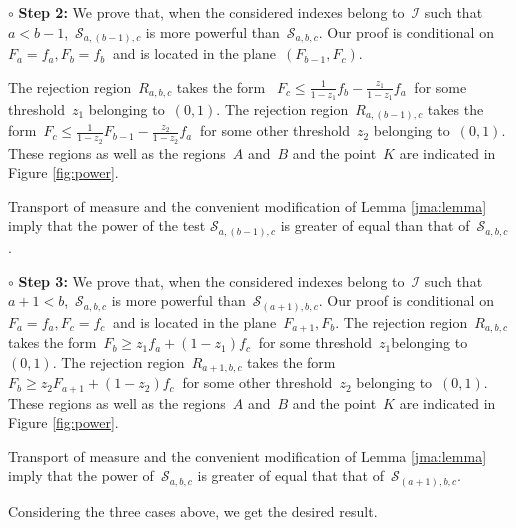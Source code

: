 \documentclass[final,numbib]{imaiai}%
\numberwithin{equation}{section}
\def\cS{\mathcal{S}}
\newcommand{\<}{\langle}
\renewcommand{\>}{\rangle}
\newcommand{\1}{\mathds{1}}
\begin{document}
{  
  
 \noindent
 {$\circ$ \bf Step 2: } We prove that, when the considered  indexes belong to~$\mathcal I$ such that~$a<b-1$,~$\cS_{a,(b-1),c}$ is more powerful than~$\cS_{a,b,c}$. 
 Our proof is conditional on~$F_a=f_a,F_b =f_b~$ and is located  
 in the plane~$(F_{b-1}, F_c)$. 
 
 
 \noindent
  The rejection region~$R_{a,b,c}$ takes the form 
~$F_c \leq  \frac{1}{1-z_1}f_b  -\frac{z_1}{1-z_1}f_a~$
   for some threshold~$z_1$ belonging to~$(0,1)$.\newline
The rejection region~$R_{a,(b-1),c}$ takes the form~$F_c \leq \frac{1}{1-z_2} F_{b-1} - \frac{z_2}{1-z_2} f_a~$ for some  other threshold~$z_2$ belonging to~$(0,1)$. \newline
These regions as well as the regions~$A$ and~$B$ and the point~$K$  are indicated in Figure \ref{fig:power}.

Transport of measure  and the convenient modification of Lemma \ref{jma:lemma} imply that the power of the test $\cS_{a,(b-1),c}$ is greater of equal than that of~$\cS_{a,b,c}$.  \bigskip



  
  
  
 \noindent
 {$\circ$ \bf Step 3: } We prove that, when the considered  indexes belong to~$\mathcal I$ such that~$a+1<b$,~$\cS_{a,b,c}$ is more powerful than~$\cS_{(a+1),b,c}$. 
  Our proof is conditional on~$F_a=f_a,F_{c} =f_{c}~$ and is located in the plane~$F_{a+1}, F_b$.\newline
The rejection region~$R_{a,b,c}$ takes the form~$F_b \geq z_1 f_a + (1-z_1)f_c~$ for some threshold~$z_1$belonging to~$(0,1)$. \newline
 The rejection region~$R_{a+1,b,c}$ takes the form~$F_b \geq z_2 F_{a+1} + (1-z_2)f_c ~$ for some  other threshold~$z_2$ belonging to~$(0,1)$.\newline
These regions as well as the regions~$A$ and~$B$ and the point~$K$  are indicated in Figure \ref{fig:power}.

Transport of measure  and  the convenient modification of Lemma \ref{jma:lemma} imply that the power of~$\cS_{a,b,c}$ is greater of equal  that that of~$\cS_{(a+1),b,c}$.  \bigskip

\noindent
Considering the three cases above,  we get the desired result. 




}
\end{document}
